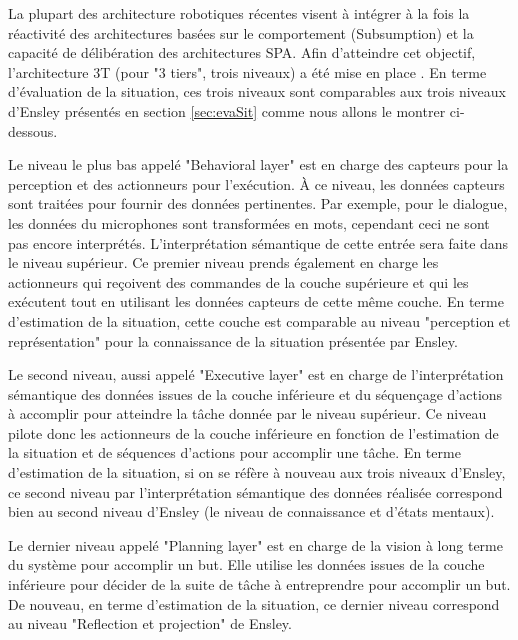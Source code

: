 \documentclass[a4paper,11pt,twoside]{StyleThese}
\begin{document}
La plupart des architecture robotiques récentes visent à intégrer à la fois la réactivité des architectures basées sur le comportement (Subsumption) et la capacité de délibération des architectures SPA.
Afin d'atteindre cet objectif, l'architecture 3T (pour "3 tiers", trois niveaux) a été mise en place \cite{8.36}. En terme d'évaluation de la situation, ces trois niveaux sont comparables aux trois niveaux d'Ensley présentés en section \ref{sec:evaSit} comme nous allons le montrer ci-dessous.

Le niveau le plus bas appelé "Behavioral layer" est en charge des capteurs pour la perception et des actionneurs pour l'exécution.
À ce niveau, les données capteurs sont traitées pour fournir des données pertinentes. Par exemple, pour le dialogue, les données du microphones sont transformées en mots, cependant ceci ne sont pas encore interprétés. L'interprétation sémantique de cette entrée sera faite dans le niveau supérieur.
Ce premier niveau prends également en charge les actionneurs qui reçoivent des commandes de la couche supérieure et qui les exécutent tout en utilisant les données capteurs de cette même couche.
En terme d'estimation de la situation, cette couche est comparable au niveau "perception et représentation" pour la connaissance de la situation présentée par Ensley.

Le second niveau, aussi appelé "Executive layer" est en charge de l'interprétation sémantique des données issues de la couche inférieure et du séquençage d'actions à accomplir pour atteindre la tâche donnée par le niveau supérieur. Ce niveau pilote donc les actionneurs de la couche inférieure en fonction de l'estimation de la situation et de séquences d'actions pour accomplir une tâche. En terme d'estimation de la situation, si on se réfère à nouveau aux trois niveaux d'Ensley, ce second niveau par l'interprétation sémantique des données réalisée correspond bien au second niveau d'Ensley (le niveau de connaissance et d'états mentaux).

Le dernier niveau appelé "Planning layer" est en charge de la vision à long terme du système pour accomplir un but. Elle utilise les données issues de la couche inférieure pour décider de la suite de tâche à entreprendre pour accomplir un but. De nouveau, en terme d'estimation de la situation, ce dernier niveau correspond au niveau "Reflection et projection" de Ensley. 
\end{document}
